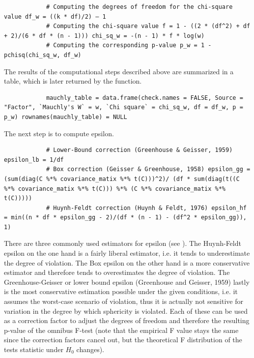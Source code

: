 \documentclass[11pt]{article}
\begin{document}
		\begin{lstlisting}
			# Computing the degrees of freedom for the chi-square value df_w = ((k * df)/2) – 1
			# Computing the chi-square value f = 1 - ((2 * (df^2) + df + 2)/(6 * df * (n - 1))) chi_sq_w = -(n - 1) * f * log(w)
			# Computing the corresponding p-value p_w = 1 - pchisq(chi_sq_w, df_w)
		\end{lstlisting} 
		
		The results of the computational steps described above are summarized in a table, which is later returned by the function.
		
		\begin{lstlisting}
			mauchly_table = data.frame(check.names = FALSE, Source = "Factor", `Mauchly's W` = w, `Chi square` = chi_sq_w, df = df_w, p = p_w) rownames(mauchly_table) = NULL
		\end{lstlisting}
		
		The next step is to compute epsilon.
		
		
		\begin{lstlisting}
			# Lower-Bound correction (Greenhouse & Geisser, 1959) epsilon_lb = 1/df
			# Box correction (Geisser & Greenhouse, 1958) epsilon_gg = (sum(diag(C %*% covariance_matix %*% t(C)))^2)/ (df * sum(diag(t((C %*% covariance_matix %*% t(C))) %*% (C %*% covariance_matix %*% t(C)))))
			# Huynh-Feldt correction (Huynh & Feldt, 1976) epsilon_hf = min((n * df * epsilon_gg - 2)/(df * (n - 1) - (df^2 * epsilon_gg)), 1)
		\end{lstlisting}
		
		There are three commonly used estimators for epsilon (see \cite{rutherford2001introducing}). The Huynh-Feldt epsilon \citep{huynh1976estimation} on the one hand is a fairly liberal estimator, i.e. it tends to underestimate the degree of violation. The Box epsilon \citep{box1954some, geisser1958extension} on the other hand is a more conservative estimator and therefore tends to overestimates the degree of violation. The Greenhouse-Geisser or lower bound epsilon (Greenhouse and Geisser, 1959) lastly is the most conservative estimation possible under the given conditions, i.e. it assumes the worst-case scenario of violation, thus it is actually not sensitive for variation in the degree by which sphericity is violated. Each of these can be used as a correction factor to adjust the degrees of freedom and therefore the resulting p-value of the omnibus F-test (note that the empirical F value stays the same since the correction factors cancel out, but the theoretical F distribution of the tests statistic under $H_0$ changes).
		
\end{document}
